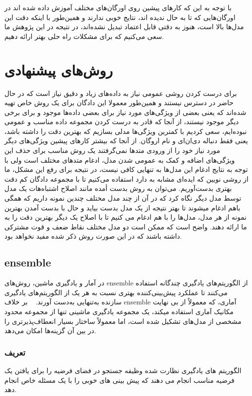 \documentclass[12pt,a4paper,BCOR=.7cm,headsepline,bibliography=totoc]{report}
\begin{document}
با توجه به این که کار‌های پیشین روی اورگان‌های مختلف آموزش داده شده اند در اورگان‌هایی که تا به حال ندیده اند، نتایج خوبی ندارند و همین‌طور با اینکه دقت این مدل‌ها بالا است، هنوز به دقتی قابل اعتماد تبدیل نشده‌اند، در نتیجه در این پژوهش ما سعی می‌کنیم که برای مشکلات راه حلی بهتر ارائه دهیم.

\chapter{روش‌های پیشنهادی}
برای درست کردن روشی عمومی نیاز به داده‌های زیاد و دقیق نیاز است که در حال حاضر در دسترس نیستند و همین‌طور معمولا این دادگان برای یک روش خاص تهیه شده‌اند که یعنی بعضی از ویژگی‌های مورد نیاز برای بعضی داده‌ها موجود و برای برخی دیگر موجود نیستند، از آنجا که قادر به درست کردن مجموعه داده مناسب و عمومی نبوده‌ایم، سعی کردیم با کمترین ویژگی‌ها مدلی بسازیم که بهترین دقت را داشته باشد، یعنی فقط دنباله دی‌ان‌ای و نام اروگان. از آنجا که بیشتر کار‌های پیشین ویژگی‌های دیگر مورد نیاز خود را از ورودی متد‌ها نمی‌گرفتند یک روش مناسب برای حذف این ویژگی‌های اضافه و کمک به عمومی شدن مدل، ادغام متد‌های مختلف است ولی با توجه به نتایج ادغام این مدل‌ها به تنهایی کافی نیست، در نتیجه برای رفع این مشکل، ما از روشی نویین که ایده‌ای مشابه به  دارد استفاده می‌کنیم تا با مجموعه دادگان کم دقت بهتری بدست‌آوریم. می‌توان به روش بدست أمده مانند اصلاح اشتباه‌هات یک مدل توسط مدل دیگر نگاه کرد که در آن از چند مدل مختلف چندین نمونه داریم که همگی باهم ادغام میشوند تا بهتر نتیجه از یک مدل بدست بیاید و حال با بدست آمدن بهترین نمونه از هر مدل، مدل‌ها را با هم ادغام می کنیم تا با اصلاح یک دیگر بهترین دقت را به ما ارائه دهند. واضح است که ممکن است دو مدل مختلف نقاط ضعف و قوت مشترکی داشته باشند که در این صورت روش ذکر شده مفید نخواهد بود.
\section{ensemble}
در آمار و یادگیری ماشین، روش‌های ensemble از الگوریتم‌های یادگیری چندگانه استفاده می‌کنند تا عملکرد پیش‌بینی‌کننده بهتری نسبت به هر یک از الگوریتم‌های یادگیری سازنده به‌تنهایی به‌دست آورند. ~\cite{Opitz, Polikar, Rokach} بر خلاف ensemble آماری، که معمولاً از بی نهایت مکانیک آماری استفاده میکند، یک مجموعه یادگیری ماشینی تنها از مجموعه محدود مشخصی از مدل‌های تشکیل شده است، اما معمولاً ساختار بسیار انعطاف‌پذیرتری را در بین آن گزینه‌ها امکان می‌دهد.
\subsection{تعریف}
الگوریتم های یادگیری نظارت شده وظیفه جستجو در فضای فرضیه را برای یافتن یک فرضیه مناسب انجام می دهند که پیش بینی های خوبی را با یک مسئله خاص انجام دهد.~\cite{Blockeel}
\end{document}
